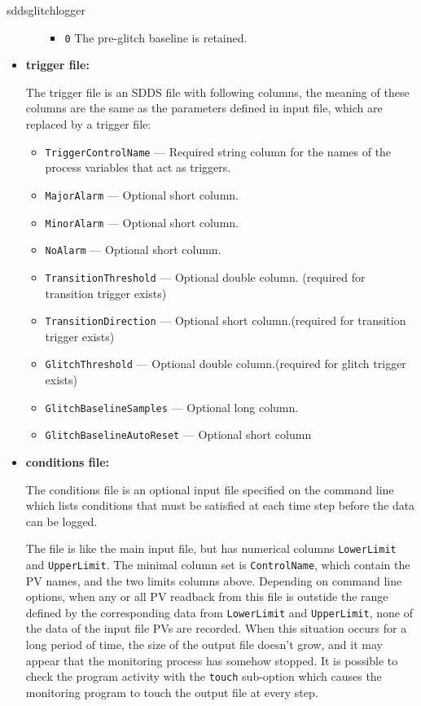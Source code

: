 \begin{sddsprog}{sddsglitchlogger}
\begin{itemize}
\begin{itemize}
\begin{itemize}
        \item {\tt 0}   The pre-glitch baseline is retained. 
\end{itemize}
\end{itemize}
\item {\bf trigger file:}\par
The trigger file is an SDDS file with following columns, the meaning of these columns are the same as
the parameters defined in input file, which are replaced by a trigger file:
\begin{itemize}
        \item {\tt TriggerControlName} --- Required string column for the names of the process variables
                that act as triggers.
        \item {\tt MajorAlarm} --- Optional short column.
        \item {\tt MinorAlarm} --- Optional short column.
        \item {\tt NoAlarm} --- Optional short column.
        \item {\tt TransitionThreshold} --- Optional double column. (required for transition trigger exists)
        \item {\tt TransitionDirection} --- Optional short column.(required for transition trigger exists)
        \item {\tt GlitchThreshold} --- Optional double column.(required for glitch trigger exists)
        \item {\tt GlitchBaselineSamples} --- Optional long column.
        \item {\tt GlitchBaselineAutoReset} --- Optional short column
\end{itemize}
\item {\bf conditions file:} \par
The conditions file is an optional input file specified on the command line which lists
conditions that must be satisfied at each time step before the data can be logged.

The file is like the main input file, but has numerical columns \verb+LowerLimit+ and \verb+UpperLimit+.
The minimal column set is \verb+ControlName+, which contain the PV names, and the two limits columns above.
Depending on command line options, when any or all PV readback from this file
is outstide the range defined by the corresponding data from \verb+LowerLimit+ and \verb+UpperLimit+,
none of the data of the input file PVs are recorded. 
When this situation occurs for a long period of time, the size of the output file doesn't
grow, and it may appear that the monitoring process has somehow stopped.
It is possible to check the program activity with the \verb+touch+ sub-option
which causes the monitoring program to touch the output file at every step.


\end{itemize}
\end{sddsprog}
